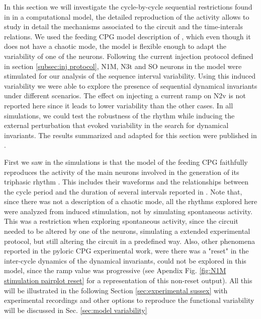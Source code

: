 In this section we will investigate the cycle-by-cycle sequential restrictions found in \cite{elices_robust_2019} in a computational model, the detailed reproduction of the activity allows to study in detail the mechanisms associated to the circuit and the time-interals relations. We used the feeding CPG model description of \cite{vavoulis_dynamic_2007}, which even though it does not have a chaotic mode, the model is flexible enough to adapt the variability of one of the neurons. Following the current injection protocol defined in section \ref{subsec:inj protocol}, N1M, N3t and SO neurons in the model were stimulated for our analysis of the sequence interval variability. Using this induced variability we were able to explore the presence of sequential dynamical invariants under different scenarios. The effect on injecting a current ramp on N2v is not reported here since it leads to lower variability than the other cases. In all simulations, we could test the robustness of the rhythm while inducing the external perturbation that evoked variability in the search for dynamical invariants. The results summarized and adapted for this section were published in \cite{garrido-pena_characterization_2021}.

First we saw in the simulations is that the model of the feeding CPG faithfully reproduces the activity of the main neurons involved in the generation of its triphasic rhythm \parencite{vavoulis_dynamical_2007}. This includes their waveforms and the relationships between the cycle period and the duration of several intervals reported in \parencite{Elliott1991}. Note that, since there was not a description of a chaotic mode, all the rhythms explored here were analyzed from induced stimulation, not by simulating spontaneous activity. This was a restriction when exploring spontaneous activity, since the circuit needed to be altered by one of the neurons, simulating a extended experimental protocol, but still altering the circuit in a predefined way. Also, other phenomena reported in the pyloric CPG experimental work, were there was a "reset" in the inter-cycle dynamics of the dynamical invariants, could not be explored in this model, since the ramp value was progressive (see Apendix Fig. \ref{fig:N1M stimulation pairplot reset} for a representation of this non-reset output). All this will be illustrated in the following Section \ref{sec:experimental sussex} with experimental recordings and other options to reproduce the functional variability will be discussed in Sec. \ref{sec:model variability}

